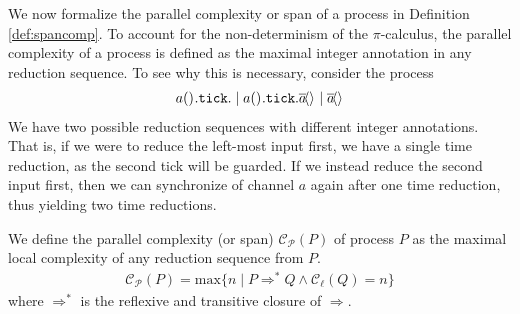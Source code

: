 We now formalize the parallel complexity or span of a process in Definition \ref{def:spancomp}. To account for the non-determinism of the $\pi$-calculus, the parallel complexity of a process is defined as the maximal integer annotation in any reduction sequence. To see why this is necessary, consider the process
%
\begin{align*}
    a()^{}.\texttt{tick}.\mid a()^{}.\texttt{tick}.\overline{a}\!\langle \rangle^{} \mid \overline{a}\!\langle \rangle^{}
\end{align*}
%
We have two possible reduction sequences with different integer annotations. That is, if we were to reduce the left-most input first, we have a single time reduction, as the second tick will be guarded. If we instead reduce the second input first, then we can synchronize of channel $a$ again after one time reduction, thus yielding two time reductions.
%
\begin{definition}\label{def:spancomp}
We define the parallel complexity (or span) $\mathcal{C}_{\mathcal{P}}(P)$ of process $P$ as the maximal local complexity of any reduction sequence from $P$.
\begin{align*}
    \mathcal{C}_{\mathcal{P}}(P) = \text{max}\{n \mid P \Longrightarrow^* Q \land \mathcal{C}_\ell(Q) = n\}
\end{align*}
where $\Longrightarrow^*$ is the reflexive and transitive closure of $\Longrightarrow$.
\end{definition}


